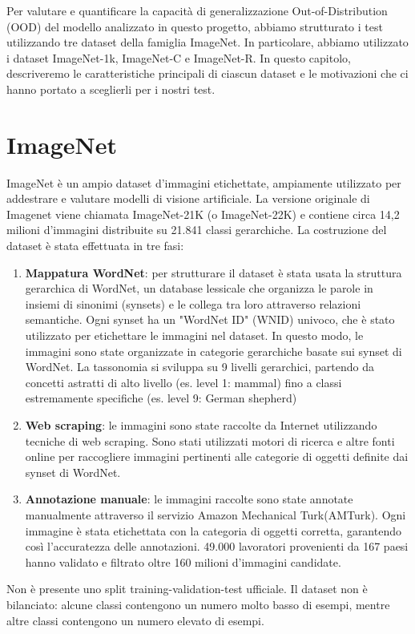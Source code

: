 Per valutare e quantificare la capacità di generalizzazione Out-of-Distribution (OOD) del modello analizzato in questo progetto, abbiamo strutturato i test utilizzando tre dataset della famiglia ImageNet. In particolare, abbiamo utilizzato i dataset ImageNet-1k, ImageNet-C e ImageNet-R.
In questo capitolo, descriveremo le caratteristiche principali di ciascun dataset e le motivazioni che ci hanno portato a sceglierli per i nostri test.
\section{ImageNet}
ImageNet è un ampio dataset d'immagini etichettate, ampiamente utilizzato per addestrare e valutare modelli di visione artificiale. La versione originale di Imagenet viene chiamata ImageNet-21K (o ImageNet-22K) e contiene circa 14,2 milioni d'immagini distribuite su 21.841 classi gerarchiche. La costruzione del dataset è stata effettuata in tre fasi:
\begin{enumerate}
	\item \textbf{Mappatura WordNet}: per strutturare il dataset è stata usata la struttura gerarchica di WordNet, un database lessicale che organizza le parole in insiemi di sinonimi (synsets) e le collega tra loro attraverso relazioni semantiche. Ogni synset ha un "WordNet ID" (WNID) univoco, che è stato utilizzato per etichettare le immagini nel dataset. In questo modo, le immagini sono state organizzate in categorie gerarchiche basate sui synset di WordNet.
	La tassonomia si sviluppa su 9 livelli gerarchici, partendo da concetti astratti di alto livello (es. level 1: mammal) fino a classi estremamente specifiche (es. level 9: German shepherd)
	\item \textbf{Web scraping}: le immagini sono state raccolte da Internet utilizzando tecniche di web scraping. Sono stati utilizzati motori di ricerca e altre fonti online per raccogliere immagini pertinenti alle categorie di oggetti definite dai synset di WordNet.
	\item \textbf{Annotazione manuale}: le immagini raccolte sono state annotate manualmente attraverso il servizio Amazon Mechanical Turk(AMTurk). Ogni immagine è stata etichettata con la categoria di oggetti corretta, garantendo così l'accuratezza delle annotazioni. 49.000 lavoratori provenienti da 167 paesi hanno validato e filtrato oltre 160 milioni d'immagini candidate.
\end{enumerate}
Non è presente uno split training-validation-test ufficiale. Il dataset non è bilanciato: alcune classi contengono un numero molto basso di esempi, mentre altre classi contengono un numero elevato di esempi.
